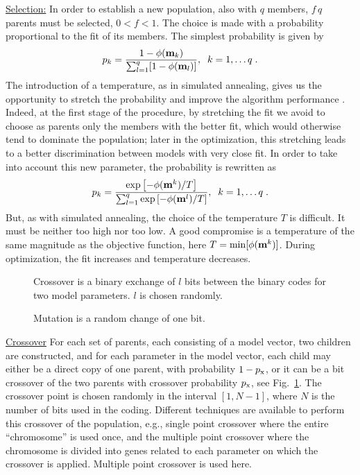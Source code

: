 \documentclass{saclantc}
\begin{document}
\underline{Selection:} In order to establish a new population, also
with $q$ members, $f \, q $ parents must be selected, $ 0 < f <1$. The
choice is made with a probability proportional to the fit of its
members. The simplest probability is given by 
\begin{equation} 
p_k =
\frac{1-\phi ({\bf m}_k)}{\sum_{l=1}^q [1-\phi ({\bf m}_l)]}, \;\;
k=1,\ldots q \; .
\label{eq:sel}
\end{equation}
The introduction of a temperature, as in simulated annealing, gives us
the opportunity to stretch the probability and improve the
 algorithm performance \cite{stoffa:g91}. Indeed, at the first
stage of the procedure, by stretching the fit we avoid to choose
as parents only the members with the better fit, which would otherwise
tend to dominate the population; later in the optimization, this
stretching leads to a better discrimination between models with very
close fit. In order to take into account this new parameter, the
probability is rewritten as
\begin{equation}
p_k = \frac{\exp \left[ -\phi ({\bf m}^k)/T \right]}{\sum_{l=1}^q 
\exp  \left[-\phi ({\bf m}^l)/T \right]}, \;\; k=1,\ldots q\; .
\label{eq:bol}
\end{equation}         
But, as with simulated annealing, the choice of the temperature $T$ is
difficult.  It must be neither too high nor too low.  A good compromise
is a temperature of the same magnitude as the objective function, here
$ T = \min [\phi ( {\bf m}^k ) ]$.  During optimization,
the fit increases and temperature decreases.

\begin{figure}
\epsfxsize=9cm
\centerline{}
\caption{Crossover is a binary exchange of $l$ bits 
between the binary codes for two
model parameters. $l$ is chosen randomly.}
\label{fig:cross}
\end{figure}
\begin{figure}
\epsfxsize=8cm
\centerline{}
\caption{Mutation is a random change of one bit.}
\label{fig:mut}
\end{figure}


\underline{Crossover}
 For each set of parents, each consisting of a model vector, two
 children are constructed, and for each parameter in the model vector,
 each child may either be a direct copy of one parent, with
 probability $1-p_{\rm x}$, or it can be a bit crossover of the two
 parents with crossover probability $p_{\rm x}$, 
 see Fig.\ \ref{fig:cross}.  The
 crossover point is chosen randomly in the interval $[ 1,N-1 ]$, where
 $N$ is the number of bits used in the coding. Different techniques
 are available to perform this crossover of the population, e.g.,
 single point crossover where the entire ``chromosome'' is used once, and
 the multiple point crossover where the chromosome is divided into
 genes related to each parameter on which the crossover is
 applied. Multiple point crossover is used here.
\end{document}
